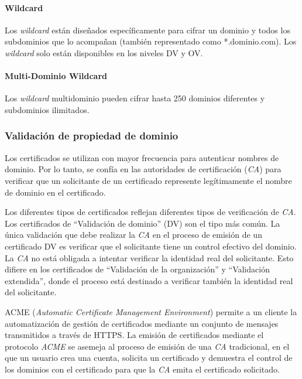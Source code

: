   \paragraph*{Wildcard}
  
  Los \emph{wildcard} están diseñados específicamente para cifrar un dominio y 
  todos los subdominios que lo acompañan (también representado como *.dominio.com). 
  Los \emph{wildcard} solo están disponibles en los 
  niveles DV y OV.
  
  \paragraph*{Multi-Dominio Wildcard}
  Los \emph{wildcard} multidominio pueden cifrar hasta 250 dominios diferentes 
  y subdominios ilimitados. 

  
\subsubsection*{Validación de propiedad de dominio}

Los certificados se utilizan con mayor frecuencia para autenticar 
nombres de dominio. Por lo tanto, se confía en las autoridades de 
certificación (\emph{CA}) para verificar que un solicitante de un certificado 
represente legítimamente el nombre de dominio en el certificado.

Los diferentes tipos de certificados reflejan diferentes tipos de 
verificación de \emph{CA}. Los certificados de “Validación de dominio” (DV) son 
el tipo más común. La única validación que debe realizar la \emph{CA} en el 
proceso de emisión de un certificado DV es verificar que el solicitante 
tiene un control efectivo del dominio. La \emph{CA} no está obligada a intentar 
verificar la identidad real del solicitante. Esto difiere en los certificados 
de “Validación de la organización” y “Validación extendida”, 
donde el proceso está destinado a verificar también la identidad real del 
solicitante.

ACME (\emph{Automatic Certificate Management Environment})
permite a un cliente 
la automatización de gestión de certificados 
mediante un conjunto de mensajes transmitidos a través de HTTPS. La 
emisión de certificados mediante el protocolo \emph{ACME} se asemeja al proceso 
de emisión de una \emph{CA} tradicional, en el que un usuario crea una cuenta, 
solicita un certificado y demuestra el control de los dominios con el 
certificado para que la \emph{CA} emita el certificado solicitado.


